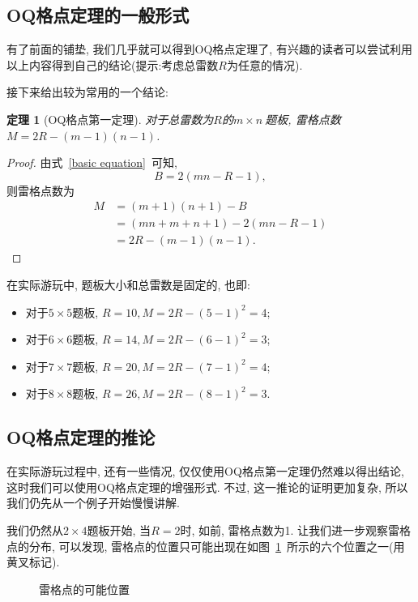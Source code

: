 \documentclass{ctexart}
\newcommand{\varible}[1]{{\Noto[#1]}}
\newcommand{\yellowcross}[2]{
    \begin{scope}[thick,color = yellow,shift={(#1,#2)}]
        \draw (0.05,-0.05) -- (-0.05,0.05);
        \draw (-0.05,-0.05) -- (0.05,0.05);
    \end{scope}
}
\newtheorem{theorem}{定理}
\begin{document}
\subsection{OQ格点定理的一般形式}
有了前面的铺垫, 我们几乎就可以得到OQ格点定理了, 有兴趣的读者可以尝试利用以上内容得到自己的结论(提示:考虑总雷数$R$为任意的情况).

接下来给出较为常用的一个结论:
\begin{theorem}[OQ格点第一定理]
    对于总雷数为$R$的$m\times n\ $\varible{O}\varible{Q}题板, 雷格点数$M = 2R - (m-1)(n-1)$.
    \label{OQ1}
\end{theorem}
\begin{proof}
    由式\ \ref{basic equation}\ 可知, 
    $$
    B = 2(mn - R -1),
    $$
    则雷格点数为
    \begin{align*}
        M &= (m+1)(n+1) - B \\
          &= (mn + m + n +1) -2(mn - R -1) \\
          &= 2R - (m-1)(n-1).
    \end{align*}
\end{proof}

在实际游玩中, 题板大小和总雷数是固定的, 也即:
\begin{itemize}
    \item 对于$5\times5$题板, $R = 10, M = 2R - (5-1)^2 = 4$;
    \item 对于$6\times6$题板, $R = 14, M = 2R - (6-1)^2 = 3$;
    \item 对于$7\times7$题板, $R = 20, M = 2R - (7-1)^2 = 4$;
    \item 对于$8\times8$题板, $R = 26, M = 2R - (8-1)^2 = 3$.
\end{itemize}

\subsection{OQ格点定理的推论}
在实际游玩过程中, 还有一些情况, 仅仅使用OQ格点第一定理仍然难以得出结论, 这时我们可以使用OQ格点定理的增强形式. 不过, 这一推论的证明更加复杂, 所以我们仍先从一个例子开始慢慢讲解.

我们仍然从$2\times4$题板开始, 当$R = 2$时, 如前, 雷格点数为1. 让我们进一步观察雷格点的分布, 可以发现, 雷格点的位置只可能出现在如图\ \ref{example2}\ 所示的六个位置之一(用黄叉标记).
\begin{figure}[ht]
    \centering
    \caption{雷格点的可能位置}
    \label{example2}
\end{figure}
\end{document}
